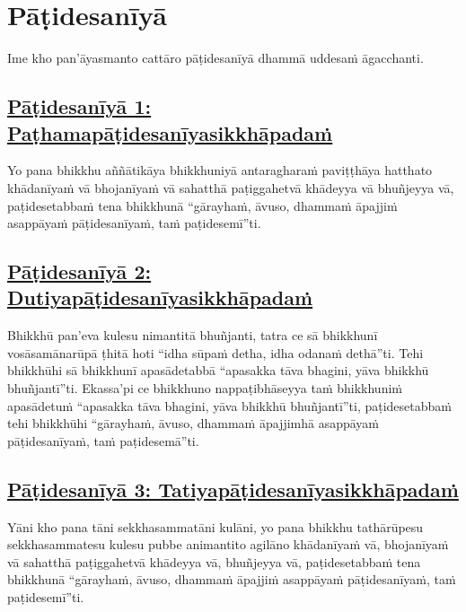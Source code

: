 \section{Pāṭidesanīyā}
\label{pd}

\begin{intro}
  Ime kho pan'āyasmanto cattāro pāṭidesanīyā dhammā uddesaṁ āgacchanti.
\end{intro}

\setsubsecheadstyle{\subsubsectionFmt}
\subsection*{\hyperref[ack1]{Pāṭidesanīyā 1: Paṭhamapāṭidesanīyasikkhāpadaṁ}}
\label{pd1}

Yo pana bhikkhu aññātikāya bhikkhuniyā antaragharaṁ paviṭṭhāya hatthato khādanīyaṁ vā bhojanīyaṁ vā sahatthā paṭiggahetvā khādeyya vā bhuñjeyya vā, paṭidesetabbaṁ tena bhikkhunā “gārayhaṁ, āvuso, dhammaṁ āpajjiṁ asappāyaṁ pāṭidesanīyaṁ, taṁ paṭidesemī”ti.

\subsection*{\hyperref[ack2]{Pāṭidesanīyā 2: Dutiyapāṭidesanīyasikkhāpadaṁ}}
\label{pd2}

Bhikkhū pan'eva kulesu nimantitā bhuñjanti, tatra ce sā bhikkhunī vosāsamānarūpā ṭhitā hoti “idha sūpaṁ detha, idha odanaṁ dethā”ti. Tehi bhikkhūhi sā bhikkhunī apasādetabbā “apasakka tāva bhagini, yāva bhikkhū bhuñjantī”ti. Ekassa'pi ce bhikkhuno nappaṭibhāseyya taṁ bhikkhuniṁ apasādetuṁ “apasakka tāva bhagini, yāva bhikkhū bhuñjantī”ti, paṭidesetabbaṁ tehi bhikkhūhi “gārayhaṁ, āvuso, dhammaṁ āpajjimhā asappāyaṁ pāṭidesanīyaṁ, taṁ paṭidesemā”ti.

\subsection*{\hyperref[ack3]{Pāṭidesanīyā 3: Tatiyapāṭidesanīyasikkhāpadaṁ}}
\label{pd3}

Yāni kho pana tāni sekkhasammatāni kulāni, yo pana bhikkhu tathārūpesu sekkhasammatesu kulesu pubbe animantito agilāno khādanīyaṁ vā, bhojanīyaṁ vā sahatthā paṭiggahetvā khādeyya vā, bhuñjeyya vā, paṭidesetabbaṁ tena bhikkhunā “gārayhaṁ, āvuso, dhammaṁ āpajjiṁ asappāyaṁ pāṭidesanīyaṁ, taṁ paṭidesemī”ti.

